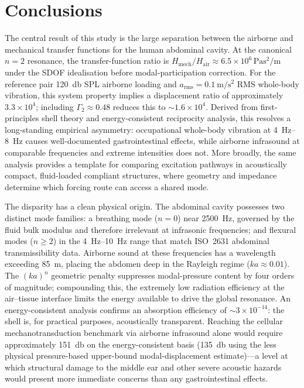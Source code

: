 \section{Conclusions}
\label{sec:conclusion}

The central result of this study is the large separation between the airborne
and mechanical transfer functions for the human abdominal cavity.  At the
canonical $n=2$ resonance, the transfer-function ratio is
$H_\mathrm{mech}/H_\mathrm{air}
\approx 6.5 \times 10^6\,\si{\pascal\second\squared\per\metre}$ under the SDOF
idealisation before modal-participation correction.  For the reference pair
\SI{120}{\decibel} SPL airborne loading and
$a_\mathrm{rms} = \SI{0.1}{\metre\per\second\squared}$ RMS whole-body vibration,
this system property implies a displacement ratio of approximately
$3.3 \times 10^4$; including $\Gamma_2 \approx 0.48$ reduces this to
$\sim 1.6 \times 10^4$.  Derived from first-principles shell theory and
energy-consistent reciprocity analysis, this resolves a long-standing empirical
asymmetry: occupational whole-body vibration at \SIrange{4}{8}{\hertz} causes
well-documented gastrointestinal effects, while airborne infrasound at
comparable frequencies and extreme intensities does not.
More broadly, the same analysis provides a template for comparing excitation
pathways in acoustically compact, fluid-loaded compliant structures, where
geometry and impedance determine which forcing route can access a shared mode.

The disparity has a clean physical origin.  The abdominal cavity possesses
two distinct mode families: a breathing mode ($n = 0$) near
\SI{2500}{\hertz}, governed by the fluid bulk modulus and therefore irrelevant
at infrasonic frequencies; and flexural modes ($n \geq 2$) in the
\SIrange{4}{10}{\hertz} range that match ISO~2631 abdominal transmissibility
data.  Airborne sound at these frequencies has a wavelength exceeding
\SI{85}{\metre}, placing the abdomen deep in the Rayleigh regime
($ka \approx 0.01$).  The $(ka)^n$ geometric penalty suppresses
modal-pressure content by four orders of magnitude; compounding this, the
extremely low radiation efficiency at the air--tissue interface limits the
energy available to drive the global resonance.  An energy-consistent analysis confirms an
absorption efficiency of $\sim 3 \times 10^{-14}$: the shell is, for practical
purposes, acoustically transparent.  Reaching the cellular mechanotransduction
benchmark via airborne infrasound alone would require approximately
\SI{151}{\decibel} on the energy-consistent basis
 (\SI{135}{\decibel} using the less physical pressure-based
upper-bound modal-displacement estimate)---a level at which structural damage
to the middle ear and other
severe acoustic hazards would present more immediate concerns than any
gastrointestinal effects.

